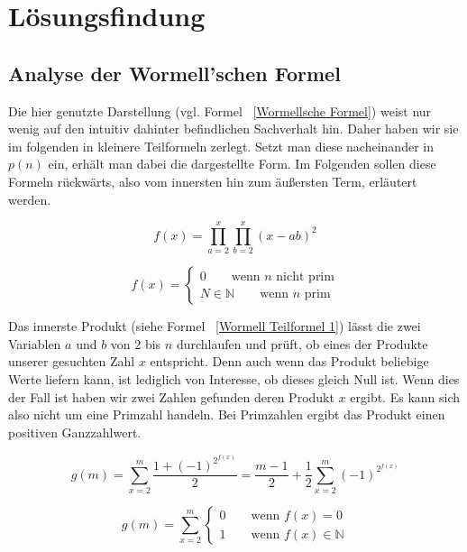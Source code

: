 \documentclass[11pt]{scrartcl}
\begin{document}
\section{Lösungsfindung}
\subsection{Analyse der Wormell'schen Formel}

Die hier genutzte Darstellung (vgl. Formel ~\ref{Wormellsche Formel}) weist nur wenig auf den intuitiv dahinter befindlichen Sachverhalt hin. Daher haben wir sie im folgenden in kleinere Teilformeln zerlegt. Setzt man diese nacheinander in $p(n)$ ein, erhält man dabei die dargestellte Form. Im Folgenden sollen diese Formeln rückwärts, also vom innersten hin zum äußersten Term, erläutert werden.

\begin{equation}
f(x) = \prod_{a=2}^{x}{\prod_{b=2}^{x}{(x-ab)^2}}
\label{Wormell Teilformel 1}
\end{equation}

\begin{equation}
f(x) = 
\begin{cases}
    0 \qquad{} \text{wenn }n \text{ nicht prim} \\
    N \in \mathbb{N} \qquad{} \text{wenn }n \text{ prim}
\end{cases}
\label{Wormell Teilformel 1 Text}
\end{equation}

Das innerste Produkt (siehe Formel ~\ref{Wormell Teilformel 1}) lässt die zwei Variablen $a$ und $b$ von $2$ bis $n$ durchlaufen und prüft, ob eines der Produkte unserer gesuchten Zahl $x$ entspricht. Denn auch wenn das Produkt beliebige Werte liefern kann, ist lediglich von Interesse, ob dieses gleich Null ist. Wenn dies der Fall ist haben wir zwei Zahlen gefunden deren Produkt $x$ ergibt. Es kann sich also nicht um eine Primzahl handeln. Bei Primzahlen ergibt das Produkt einen positiven Ganzzahlwert.


\begin{equation}
g(m) = \sum_{x=2}^{m}{\frac{1+(-1)^{2^{f(x)}}}{2}} = \frac{m-1}{2} + \frac{1}{2} \sum_{x=2}^{m}{(-1)^{2^{f(x)}}}
\label{Wormell Teilformel 2}
\end{equation}

\begin{equation}
g(m) = \sum_{x=2}^{m}
\begin{cases}
    0 \qquad{} \text{wenn }f(x)=0 \\
    1 \qquad{} \text{wenn }f(x) \in \mathbb{N}
\end{cases}
\label{Wormell Teilformel 2 Text}
\end{equation}
\end{document}
